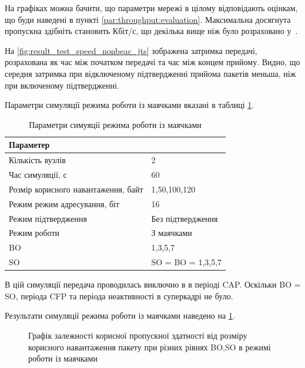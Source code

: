 \documentclass[a4paper,ukrainian,utf8,nocolumnsxix,floatsection,equationsection]{eskdtext}
\begin{document}
На графіках можна бачити, що параметри мережі в цілому відповідають оцінкам, що буди наведені в пункті \ref{par:throughput:evaluation}. Максимальна досягнута пропускна здібніть становить  Кбіт/с, що декілька вище ніж було розраховано у~\cite{thoroughput:analysis:unslotted:ieee}. 

На \cref{fig:result_test_speed_nonbeac_jts} зображена затримка передачі, розрахована як час між початком передачі та час між концем прийому. Видно, що середня затримка при відключеному підтвердженні прийома пакетів меньша, ніж при включеному підтвердженні.

	
	\clearpage
Параметри симуляції режима роботи із маячками вказані в таблиці \ref{tbl:simulation_settings_beackon_cap}. 

\begin{table}[htbp]
\caption{Параметри симуяції режима роботи із маячками}
\centering
\begin{tabular}{|l|l|}
	\hline
	Параметер                           &                   \\ \hline
	Кількість вузлів                    & 2                 \\ \hline
	Час симуляції, с                    & 60                \\ \hline
	Розмір корисного навантаження, байт & 1,50,100,120      \\ \hline
	Режим режим адресування, біт        & 16                \\ \hline
	Режим підтвердження                 & Без підтвердження \\ \hline
	Режим роботи                        & З маячками        \\ \hline
	BO                                  & 1,3,5,7           \\ \hline
	SO                                  & SO = BO = 1,3,5,7 \\ \hline
\end{tabular}
\label{tbl:simulation_settings_beackon_cap}
\end{table}

В цій симуляції передача проводилась виключно в в періоді CAP. Оскільки BO = SO, періода CFP та періода неактивності в суперкадрі не було.

Результати симуляції режима роботи із маячками наведено на \cref{fig:result_tp_beacon}.

\begin{figure}[bth]
	\centering
	\caption{\label{fig:result_tp_beacon}Графік залежності корисної пропускної здатності від розміру корисного навантаження пакету при різних рівнях BO,SO в режимі роботи із маячками}
\end{figure}
\end{document}
